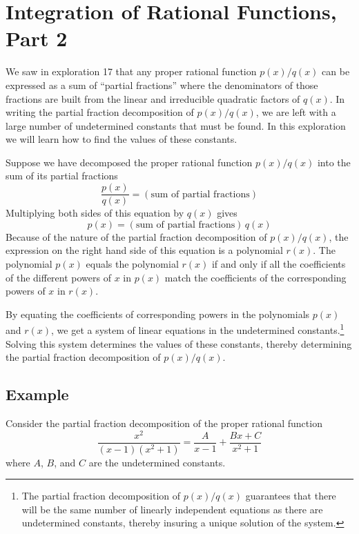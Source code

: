 \documentclass[12pt,letterpaper,fleqn]{article}
\theoremstyle{definition}
\begin{document}
\section*{Integration of Rational Functions, Part 2}
We saw in exploration 17 that any proper rational function $p(x)/q(x)$ can be expressed as a sum of ``partial fractions'' where the denominators of those fractions are built from the linear and irreducible quadratic factors of $q(x)$. In writing the partial fraction decomposition of $p(x)/q(x)$, we are left with a large number of undetermined constants that must be found. In this exploration we will learn how to find the values of these constants.

Suppose we have decomposed the proper rational function $p(x)/q(x)$ into the sum of its partial fractions
\begin{equation*}
 \frac{p(x)}{q(x)} = (\text{sum of partial fractions})
\end{equation*}
Multiplying both sides of this equation by $q(x)$ gives
\begin{equation*}
 p(x) = (\text{sum of partial fractions})\,q(x)
\end{equation*}
Because of the nature of the partial fraction decomposition of $p(x)/q(x)$, the expression on the right hand side of this equation is a polynomial $r(x)$. The polynomial $p(x)$ equals the polynomial $r(x)$ if and only if all the coefficients of the different powers of $x$ in $p(x)$ match the coefficients of the corresponding powers of $x$ in $r(x)$.

By equating the coefficients of corresponding powers in the polynomials $p(x)$ and $r(x)$, we get a system of linear equations in the undetermined constants.\footnote{The partial fraction decomposition of $p(x)/q(x)$ guarantees that there will be the same number of linearly independent equations as there are undetermined constants, thereby insuring a unique solution of the system.} Solving this system determines the values of these constants, thereby determining the partial fraction decomposition of $p(x)/q(x)$.
\subsection*{Example}
Consider the partial fraction decomposition of the proper rational function
\begin{equation*}
 \frac{x^2}{(x-1)(x^2 + 1)} = \frac{A}{x-1} + \frac{Bx + C}{x^2 + 1}
\end{equation*}
where $A$, $B$, and $C$ are the undetermined constants.
\end{document}

